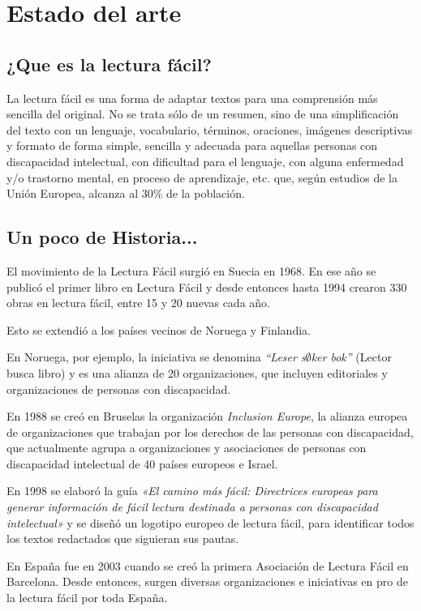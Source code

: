 \chapter{Estado del arte}
\label{cap:estadoDeLaCuestion}


\section{¿Que es la lectura fácil?}
La lectura fácil es una forma de adaptar textos para una comprensión más sencilla del original. No se trata sólo de un resumen, sino de una simplificación del texto con un lenguaje, vocabulario, términos, oraciones, imágenes descriptivas y formato de forma simple, sencilla y adecuada para aquellas personas con discapacidad intelectual, con dificultad para el lenguaje, con alguna enfermedad y/o trastorno mental, en proceso de aprendizaje, etc. que, según estudios de la Unión Europea, alcanza al 30\% de la población.

\section{Un poco de Historia...}
El movimiento de la Lectura Fácil surgió en Suecia en 1968. En ese año se publicó el primer libro en Lectura Fácil y desde entonces hasta 1994 crearon 330 obras en lectura fácil, entre 15 y 20 nuevas cada año.

Esto se extendió a los países vecinos de Noruega y Finlandia.

En Noruega, por ejemplo, la iniciativa se denomina \textit{“Leser s$\emptyset$ker bok”} (Lector busca libro) y es una alianza de 20 organizaciones, que incluyen editoriales y organizaciones de personas con discapacidad.

En 1988 se creó en Bruselas la organización \textit{Inclusion Europe}, la alianza europea de organizaciones que trabajan por los derechos de las personas con discapacidad, que actualmente agrupa a organizaciones y asociaciones de personas con discapacidad intelectual de 40 países europeos e Israel.

En 1998 se elaboró la guía \textit{«El camino más fácil: Directrices europeas para generar información de fácil lectura destinada a personas con discapacidad intelectual»} y se diseñó un logotipo europeo de lectura fácil, para identificar todos los textos redactados que siguieran sus pautas.

En España fue en 2003 cuando se creó la primera Asociación de Lectura Fácil en Barcelona. Desde entonces, surgen diversas organizaciones e iniciativas en pro de la lectura fácil por toda España.

